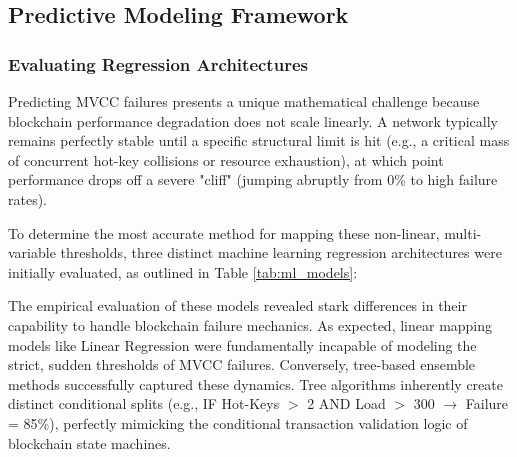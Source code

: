 ﻿\documentclass[12pt]{article}
\begin{document}
\subsection{Predictive Modeling Framework}



\subsubsection{Evaluating Regression Architectures}
Predicting MVCC failures presents a unique mathematical challenge because blockchain performance degradation does not scale linearly. A network typically remains perfectly stable until a specific structural limit is hit (e.g., a critical mass of concurrent hot-key collisions or resource exhaustion), at which point performance drops off a severe "cliff" (jumping abruptly from 0\% to high failure rates). 

To determine the most accurate method for mapping these non-linear, multi-variable thresholds, three distinct machine learning regression architectures were initially evaluated, as outlined in Table \ref{tab:ml_models}:

\begin{table}[ht]
\centering
\caption{Evaluated Machine Learning Regression Architectures}
\label{tab:ml_models}
\end{table}

The empirical evaluation of these models revealed stark differences in their capability to handle blockchain failure mechanics. As expected, linear mapping models like Linear Regression were fundamentally incapable of modeling the strict, sudden thresholds of MVCC failures. Conversely, tree-based ensemble methods successfully captured these dynamics. Tree algorithms inherently create distinct conditional splits (e.g., IF Hot-Keys $>$ 2 AND Load $>$ 300 $\rightarrow$ Failure = 85\%), perfectly mimicking the conditional transaction validation logic of blockchain state machines. 
\end{document}
